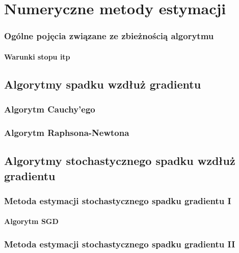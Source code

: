 \chapter{Numeryczne metody estymacji}
\subsection{Ogólne pojęcia związane ze zbieżnością algorytmu}
\subsubsection{Warunki stopu itp}
\section{Algorytmy spadku wzdłuż gradientu}
\subsection{Algorytm Cauchy'ego}
\subsection{Algorytm Raphsona-Newtona}
\section{Algorytmy stochastycznego spadku wzdłuż gradientu}
\subsection{Metoda estymacji stochastycznego spadku gradientu I}
\subsubsection{Algorytm SGD}
\subsection{Metoda estymacji stochastycznego spadku gradientu II}
